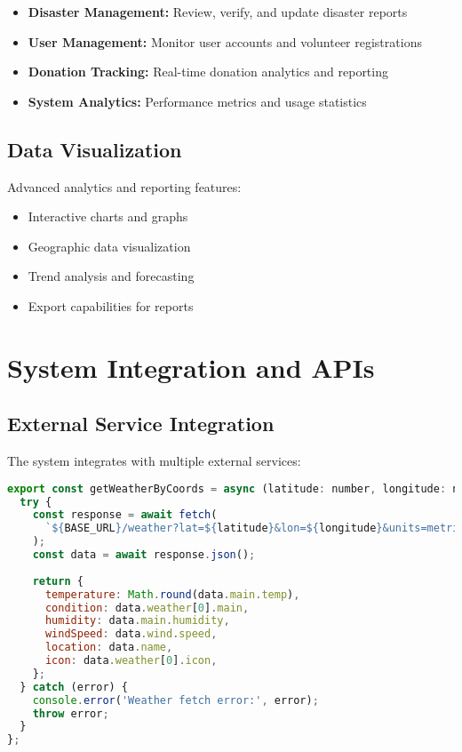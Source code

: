 \documentclass[12pt,a4paper]{article}
\begin{document}
\begin{itemize}
    \item \textbf{Disaster Management:} Review, verify, and update disaster reports
    \item \textbf{User Management:} Monitor user accounts and volunteer registrations
    \item \textbf{Donation Tracking:} Real-time donation analytics and reporting
    \item \textbf{System Analytics:} Performance metrics and usage statistics
\end{itemize}

\subsection{Data Visualization}

Advanced analytics and reporting features:
\begin{itemize}
    \item Interactive charts and graphs
    \item Geographic data visualization
    \item Trend analysis and forecasting
    \item Export capabilities for reports
\end{itemize}

\section{System Integration and APIs}

\subsection{External Service Integration}

The system integrates with multiple external services:

\begin{lstlisting}[language=JavaScript, caption=Weather Service Integration]
export const getWeatherByCoords = async (latitude: number, longitude: number): Promise<WeatherData> => {
  try {
    const response = await fetch(
      `${BASE_URL}/weather?lat=${latitude}&lon=${longitude}&units=metric&appid=${API_KEY}`
    );
    const data = await response.json();
    
    return {
      temperature: Math.round(data.main.temp),
      condition: data.weather[0].main,
      humidity: data.main.humidity,
      windSpeed: data.wind.speed,
      location: data.name,
      icon: data.weather[0].icon,
    };
  } catch (error) {
    console.error('Weather fetch error:', error);
    throw error;
  }
};
\end{lstlisting}
\end{document}
